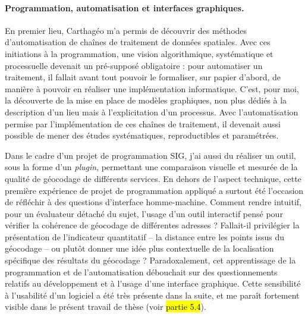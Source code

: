 \paragraph{Programmation, automatisation et interfaces graphiques.}
En premier lieu, Carthagéo m'a permis de découvrir des méthodes d'automatisation de chaînes de traitement de données spatiales.
Avec ces initiations à la programmation, une vision algorithmique, systématique et processuelle devenait un pré-supposé obligatoire : pour automatiser un traitement, il fallait avant tout pouvoir le formaliser, sur papier d'abord, de manière à pouvoir en réaliser une implémentation informatique.
C'est, pour moi, la découverte de la mise en place de modèles graphiques, non plus dédiés à la description d'un lieu mais à l'explicitation d'un processus.
Avec l'automatisation permise par l'implémentation de ces chaînes de traitement, il devenait aussi possible de mener des études systématiques, reproductibles et paramétrées.

Dans le cadre d'un projet de programmation SIG, j'ai aussi du réaliser un outil, sous la forme d'un \textit{plugin}, permettant une comparaison visuelle et mesurée de la qualité de géocodage de différents services.
En dehors de l'aspect technique, cette première expérience de projet de programmation appliqué a surtout été l'occasion de réfléchir à des questions d'interface homme-machine.
Comment rendre intuitif, pour un évaluateur détaché du sujet, l'usage d'un outil interactif pensé pour vérifier la cohérence de géocodage de différentes adresses ? Fallait-il privilégier la présentation de l'indicateur quantitatif  -- la distance entre les points issus du géocodage -- ou plutôt donner une idée plus contextuelle de la localisation spécifique des résultats du géocodage ?
Paradoxalement, cet apprentissage de la programmation et de l'automatisation débouchait sur des questionnements relatifs au développement et à l'usage d'une interface graphique.
Cette sensibilité à l'\og usabilité\fg{} d'un logiciel a été très présente dans la suite, et me paraît fortement visible dans le présent travail de thèse (voir \hl{partie 5.4}).

